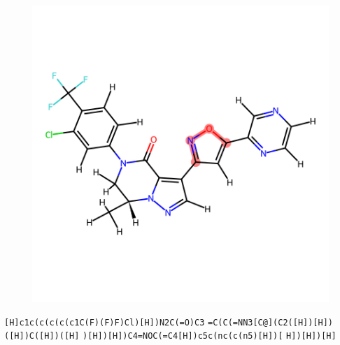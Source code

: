 \documentclass{article}
\begin{document}
\begin{figure}[ht]
\centering
    \includegraphics{mol294.png}
\end{figure}
\verb|[H]c1c(c(c(c(c1C(F)(F)F)Cl)[H])N2C(=O)C3| \verb|=C(C(=NN3[C@](C2([H])[H])([H])C([H])([H]| \verb|)[H])[H])C4=NOC(=C4[H])c5c(nc(c(n5)[H])[| \verb|H])[H])[H]|
\end{document}
